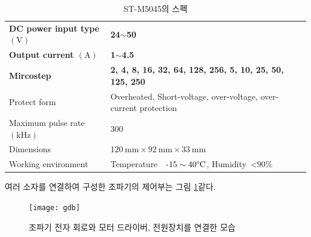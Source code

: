 \begin{table}[H]
    \centering
    \captionsetup{justification=centering}
    \caption{ST-M5045의 스펙}
    \begin{tabular}{ll}
        \hline
        \textbf{DC power input type $(\mathrm{V})$}  & \textbf{24$\sim$50}      \\
        \textbf{Output current $(\mathrm{A})$}       & \textbf{1$\sim$4.5}      \\
        \textbf{Mircostep}           & \textbf{2, 4, 8, 16, 32, 64, 128, 256, 5, 10, 25, 50, 125, 250               }                \\
        Protect form        & Overheated, Short-voltage, over-voltage, over-current protection \\
        Maximum pulse rate $(\mathrm{kHz})$ & 300             \\
        Dimensions               & $120\mathrm{~mm} \times92\mathrm{~mm}\times33\mathrm{~mm}$ \\
        Working environment & Temperature~~-$15\sim40\mathrm{\degree C}$, Humidity~\textless{}$90\%$ \\ 
        \hline
    \end{tabular}
    \label{Specification of ST-M5045}
\end{table}

여러 소자를 연결하여 구성한 조파기의 제어부는 그림 \ref{Wavemaker}\와 같다.

\begin{figure}[H]
	\begin{center}
		\texttt{[image: gdb]}
		\caption{조파기 전자 회로와 모터 드라이버, 전원장치를 연결한 모습}
		\label{Wavemaker}
	\end{center}
\end{figure}





